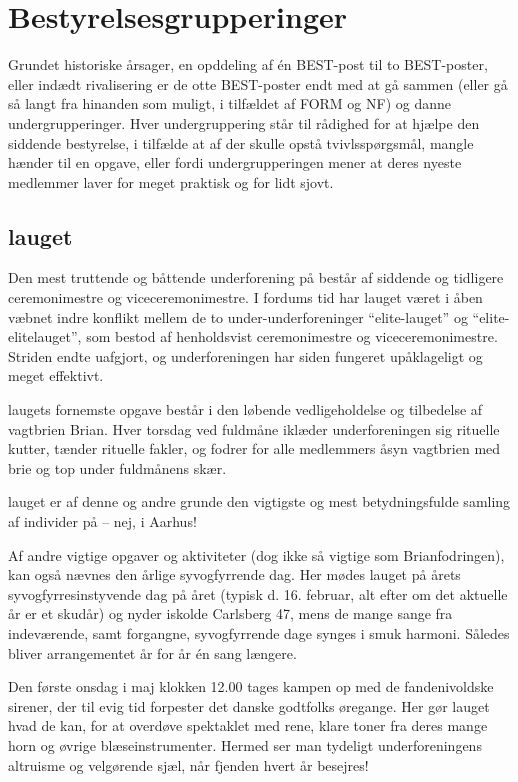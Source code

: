 \section{Bestyrelsesgrupperinger}
Grundet historiske årsager, en opddeling af én BEST-post til to BEST-poster, eller indædt rivalisering er de otte BEST-poster endt med at gå sammen (eller gå så langt fra hinanden som muligt, i tilfældet af FORM og NF) og danne undergrupperinger. Hver undergruppering står til rådighed for at hjælpe den siddende bestyrelse, i tilfælde at af der skulle opstå tvivlsspørgsmål, mangle hænder til en opgave, eller fordi undergrupperingen mener at deres nyeste medlemmer laver for meget praktisk og for lidt sjovt.

\subsection{\CERM{}lauget}
Den mest truttende og båttende underforening på \TKET består af siddende og tidligere ceremonimestre og viceceremonimestre. I fordums tid har lauget været i åben væbnet indre konflikt mellem de to under-underforeninger ``elite-\CERM{}lauget'' og ``elite-elite\CERM{}lauget'', som bestod af henholdsvist ceremonimestre og viceceremonimestre. Striden endte uafgjort, og underforeningen har siden fungeret upåklageligt og meget effektivt.\par

\CERM{}laugets fornemste opgave består i den løbende vedligeholdelse og tilbedelse af vagtbrien Brian. Hver torsdag ved fuldmåne iklæder underforeningen sig rituelle kutter, tænder rituelle fakler, og fodrer for alle medlemmers åsyn vagtbrien med brie og top under fuldmånens skær.\par

\CERM{}lauget er af denne og andre grunde den vigtigste og mest betydningsfulde samling af individer på \TKET -- nej, i Aarhus!\par

Af andre vigtige opgaver og aktiviteter (dog ikke så vigtige som Brianfodringen), kan også nævnes den årlige syvogfyrrende dag. Her mødes \CERM{}lauget på årets syvogfyrresinstyvende dag på året (typisk d. 16. februar, alt efter om det aktuelle år er et skudår) og nyder iskolde Carlsberg 47, mens de mange sange fra indeværende, samt forgangne, syvogfyrrende dage synges i smuk harmoni. Således bliver arrangementet år for år én sang længere.\par

Den første onsdag i maj klokken 12.00 tages kampen op med de fandenivoldske sirener, der til evig tid forpester det danske godtfolks øregange. Her gør \CERM{}lauget hvad de kan, for at overdøve spektaklet med rene, klare toner fra deres mange horn og øvrige blæseinstrumenter. Hermed ser man tydeligt underforeningens altruisme og velgørende sjæl, når fjenden hvert år besejres!\par

